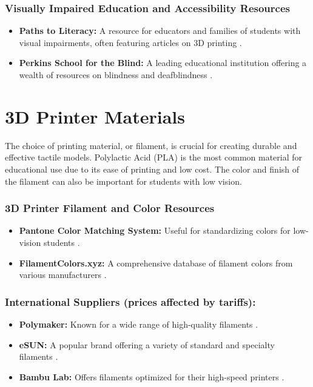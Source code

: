 \subsubsection{Visually Impaired Education and Accessibility Resources}
\begin{itemize}
	\item \textbf{Paths to Literacy:} A resource for educators and families of students with visual impairments, often featuring articles on 3D printing \supercite{PathsToLiteracy}.
	\item \textbf{Perkins School for the Blind:} A leading educational institution offering a wealth of resources on blindness and deafblindness \supercite{Perkins}.
\end{itemize}

\section{3D Printer Materials}\label{ch5:sec:materials}
The choice of printing material, or filament, is crucial for creating durable and effective tactile models. Polylactic Acid (PLA) is the most common material for educational use due to its ease of printing and low cost. The color and finish of the filament can also be important for students with low vision.

\subsubsection{3D Printer Filament and Color Resources}
\begin{itemize}
	\item \textbf{Pantone Color Matching System:} Useful for standardizing colors for low-vision students \supercite{Pantone}.
	\item \textbf{FilamentColors.xyz:} A comprehensive database of filament colors from various manufacturers \supercite{FilamentColors}.
\end{itemize}

\subsubsection{International Suppliers (prices affected by tariffs):}
\begin{itemize}
	\item \textbf{Polymaker:} Known for a wide range of high-quality filaments \supercite{Polymaker}.
	\item \textbf{eSUN:} A popular brand offering a variety of standard and specialty filaments \supercite{eSUN}.
	\item \textbf{Bambu Lab:} Offers filaments optimized for their high-speed printers \supercite{BambuLab}.
\end{itemize}

